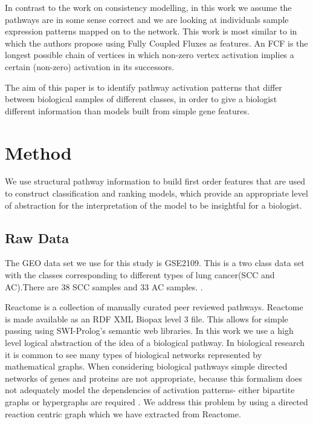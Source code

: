 \documentclass[runningheads,a4paper]{llncs}
\begin{document}
In contrast to the work on consistency modelling, in this work we assume the pathways are in some sense correct and we are looking at individuals sample expression patterns mapped on to the network. This work is most similar to  \citep{holec2008using} in which the authors propose using Fully Coupled Fluxes as features. An FCF is the longest possible chain of vertices in which non-zero vertex activation implies a certain (non-zero) activation in its successors.

The aim of this paper is to identify pathway activation patterns that differ between biological samples of different classes, in order to give a biologist different information than models built from simple gene features. 

	  
\section{Method}
We use structural pathway information to build first order features that are used to construct classification and ranking models, which  provide an appropriate level of abstraction for the interpretation of the model to be insightful for a biologist. 
\subsection{Raw Data}
The GEO data set we use for this study is GSE2109. This is a two class data set with the classes corresponding to different types of lung cancer(SCC and AC).There are 38 SCC samples and 33 AC samples. .
	
Reactome \citep{croft_reactome_2013} is a collection of manually curated peer reviewed pathways. Reactome is made available as an RDF XML Biopax level 3 file. This allows for simple passing using SWI-Prolog's semantic web libraries. 
In this work we use a high level logical abstraction of the idea of a biological pathway. In biological research it is common to see many types of biological networks represented by mathematical graphs. When considering biological pathways simple directed networks of genes and proteins are not appropriate, because this formalism does not adequately model the dependencies of activation patterns- either bipartite graphs or hypergraphs are required \citep{whelan2011representation}. We address this problem by using a directed reaction centric graph which we have extracted from Reactome.
\end{document}
